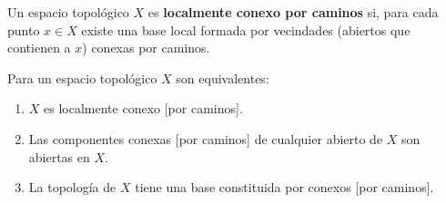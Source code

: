 \begin{definición}
    Un espacio topológico $X$ es \textbf{localmente conexo por caminos} si, para cada punto $x \in X$ existe una base local formada por vecindades (abiertos que contienen a $x$) conexas por caminos.    
\end{definición}

\begin{teorema}
    Para un espacio topológico $X$ son equivalentes:
    \begin{enumerate}[label=\alph*)]
        \item $X$ es localmente conexo [por caminos].
        \item Las componentes conexas [por caminos] de cualquier abierto de $X$ son abiertas en $X$.
        \item La topología de $X$ tiene una base constituida por conexos [por caminos].
    \end{enumerate}
\end{teorema}
